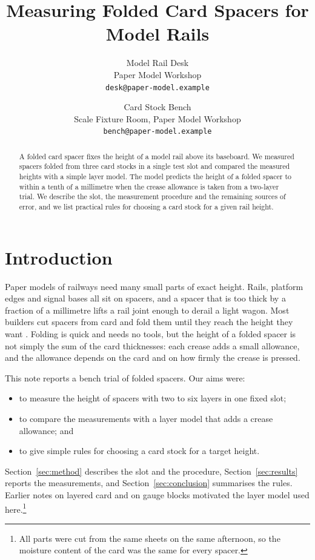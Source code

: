 \documentclass[10pt,twocolumn,letterpaper]{article}
\title{Measuring Folded Card Spacers for Model Rails}
\author{Model Rail Desk\\
Paper Model Workshop\\
{\tt\small desk@paper-model.example}
\and
Card Stock Bench\\
Scale Fixture Room, Paper Model Workshop\\
{\tt\small bench@paper-model.example}
}
\begin{document}
\maketitle

\begin{abstract}
A folded card spacer fixes the height of a model rail above its baseboard.
We measured spacers folded from three card stocks in a single test slot and
compared the measured heights with a simple layer model. The model predicts the
height of a folded spacer to within a tenth of a millimetre when the crease
allowance is taken from a two-layer trial. We describe the slot, the measurement
procedure and the remaining sources of error, and we list practical rules for
choosing a card stock for a given rail height.
\end{abstract}

\section{Introduction}\label{sec:intro}
Paper models of railways need many small parts of exact height. Rails,
platform edges and signal bases all sit on spacers, and a spacer that is too
thick by a fraction of a millimetre lifts a rail joint enough to derail a light
wagon. Most builders cut spacers from card and fold them until they reach the
height they want \citep{desk25}. Folding is quick and needs no tools, but the
height of a folded spacer is not simply the sum of the card thicknesses: each
crease adds a small allowance, and the allowance depends on the card and on how
firmly the crease is pressed.

This note reports a bench trial of folded spacers. Our aims were:
\begin{itemize}
\item to measure the height of spacers with two to six layers in one fixed slot;
\item to compare the measurements with a layer model that adds a crease allowance; and
\item to give simple rules for choosing a card stock for a target height.
\end{itemize}
Section~\ref{sec:method} describes the slot and the procedure, Section~\ref{sec:results}
reports the measurements, and Section~\ref{sec:conclusion} summarises the rules.
Earlier notes on layered card \citep{bench24} and on gauge blocks
\citep{scale23} motivated the layer model used here.\footnote{All parts were
cut from the same sheets on the same afternoon, so the moisture content of the
card was the same for every spacer.}
\end{document}
